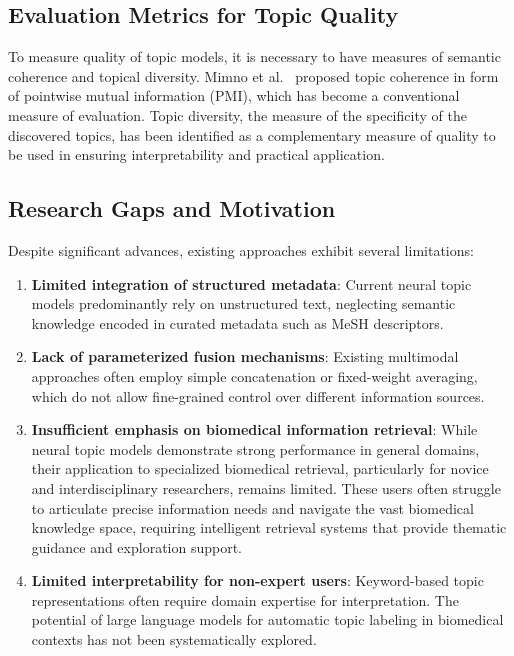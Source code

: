 \documentclass{ieeeaccess}
\begin{document}
\subsection{Evaluation Metrics for Topic Quality}

To measure quality of topic models, it is necessary to have measures of semantic coherence and topical diversity. Mimno et al.~\cite{mimno_optimizing_2011} proposed topic coherence in form of pointwise mutual information (PMI), which has become a conventional measure of evaluation. Topic diversity, the measure of the specificity of the discovered topics, has been identified as a complementary measure of quality to be used in ensuring interpretability and practical application.

\subsection{Research Gaps and Motivation}

Despite significant advances, existing approaches exhibit several limitations:

\begin{enumerate}[leftmargin=*,label=\arabic*)]
    \item \textbf{Limited integration of structured metadata}: Current neural topic models predominantly rely on unstructured text, neglecting semantic knowledge encoded in curated metadata such as MeSH descriptors.
    
    \item \textbf{Lack of parameterized fusion mechanisms}: Existing multimodal approaches often employ simple concatenation or fixed-weight averaging, which do not allow fine-grained control over different information sources.
    
    \item \textbf{Insufficient emphasis on biomedical information retrieval}: While neural topic models demonstrate strong performance in general domains, their application to specialized biomedical retrieval, particularly for novice and interdisciplinary researchers, remains limited. These users often struggle to articulate precise information needs and navigate the vast biomedical knowledge space, requiring intelligent retrieval systems that provide thematic guidance and exploration support.
    
    \item \textbf{Limited interpretability for non-expert users}: Keyword-based topic representations often require domain expertise for interpretation. The potential of large language models for automatic topic labeling in biomedical contexts has not been systematically explored.
\end{enumerate}
\end{document}
